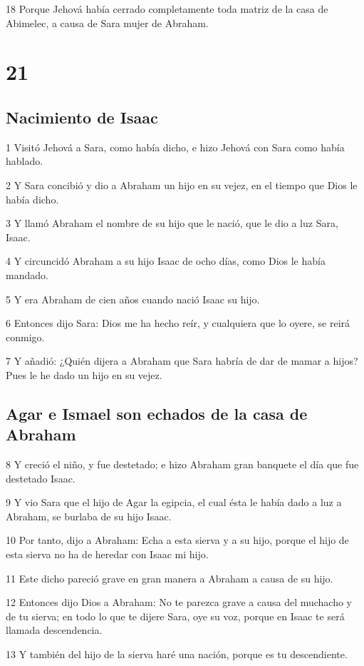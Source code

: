 18 Porque Jehová había cerrado completamente toda matriz de la casa de Abimelec, a causa de Sara mujer de Abraham.

\chapter{21}

\section{Nacimiento de Isaac}

1 Visitó Jehová a Sara, como había dicho, e hizo Jehová con Sara como había hablado.

2 Y Sara concibió y dio a Abraham un hijo en su vejez, en el tiempo que Dios le había dicho.

3 Y llamó Abraham el nombre de su hijo que le nació, que le dio a luz Sara, Isaac.

4 Y circuncidó Abraham a su hijo Isaac de ocho días, como Dios le había mandado.

5 Y era Abraham de cien años cuando nació Isaac su hijo.

6 Entonces dijo Sara: Dios me ha hecho reír, y cualquiera que lo oyere, se reirá conmigo.

7 Y añadió: ¿Quién dijera a Abraham que Sara habría de dar de mamar a hijos? Pues le he dado un hijo en su vejez.

\section{Agar e Ismael son echados de la casa de Abraham}

8 Y creció el niño, y fue destetado; e hizo Abraham gran banquete el día que fue destetado Isaac.

9 Y vio Sara que el hijo de Agar la egipcia, el cual ésta le había dado a luz a Abraham, se burlaba de su hijo Isaac.

10 Por tanto, dijo a Abraham: Echa a esta sierva y a su hijo, porque el hijo de esta sierva no ha de heredar con Isaac mi hijo.

11 Este dicho pareció grave en gran manera a Abraham a causa de su hijo.

12 Entonces dijo Dios a Abraham: No te parezca grave a causa del muchacho y de tu sierva; en todo lo que te dijere Sara, oye su voz, porque en Isaac te será llamada descendencia.

13 Y también del hijo de la sierva haré una nación, porque es tu descendiente.

